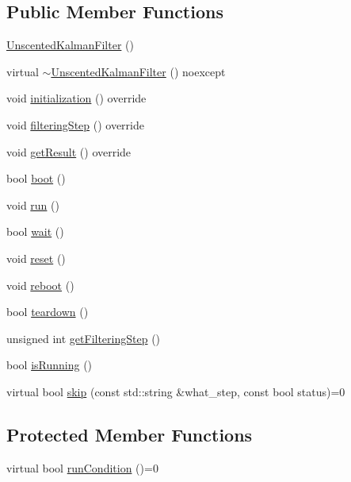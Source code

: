 \subsection*{Public Member Functions}
\begin{DoxyCompactItemize}
\item 
\mbox{\hyperlink{classbfl_1_1UnscentedKalmanFilter_a18a80ca47ed5440b116e1abd8be406b6}{Unscented\+Kalman\+Filter}} ()
\item 
virtual \mbox{\hyperlink{classbfl_1_1UnscentedKalmanFilter_ac3b1c8406622c7295da808fe95e4c170}{$\sim$\+Unscented\+Kalman\+Filter}} () noexcept
\item 
void \mbox{\hyperlink{classbfl_1_1UnscentedKalmanFilter_acd5cfc6344d9ce24fb980aa22ecf4895}{initialization}} () override
\item 
void \mbox{\hyperlink{classbfl_1_1UnscentedKalmanFilter_a169451bb711a03ad2dc28a40e3ad867f}{filtering\+Step}} () override
\item 
void \mbox{\hyperlink{classbfl_1_1UnscentedKalmanFilter_ad25c4f9143bbe834b3adfc81c78b6743}{get\+Result}} () override
\item 
bool \mbox{\hyperlink{classbfl_1_1FilteringAlgorithm_a96651f8464190c0a56d79219a1017147}{boot}} ()
\item 
void \mbox{\hyperlink{classbfl_1_1FilteringAlgorithm_a009cbe5f4bbb16967f6c6ddcaed8fbb1}{run}} ()
\item 
bool \mbox{\hyperlink{classbfl_1_1FilteringAlgorithm_a40372c24fa050eb0274371172df0a244}{wait}} ()
\item 
void \mbox{\hyperlink{classbfl_1_1FilteringAlgorithm_a2403c62fbd7bd7f5cda56a84f5f30331}{reset}} ()
\item 
void \mbox{\hyperlink{classbfl_1_1FilteringAlgorithm_a6022859aa985474fb997343cc935b11e}{reboot}} ()
\item 
bool \mbox{\hyperlink{classbfl_1_1FilteringAlgorithm_a1dc912d89ee8f96d4f3e8209865c5308}{teardown}} ()
\item 
unsigned int \mbox{\hyperlink{classbfl_1_1FilteringAlgorithm_a8c43b1f3dac30934c0a03de348d4a29d}{get\+Filtering\+Step}} ()
\item 
bool \mbox{\hyperlink{classbfl_1_1FilteringAlgorithm_a5cfecab2c778620e2557237472bb1721}{is\+Running}} ()
\item 
virtual bool \mbox{\hyperlink{classbfl_1_1FilteringAlgorithm_ac8a718a614905d89d6a43bbbc70d68b2}{skip}} (const std\+::string \&what\+\_\+step, const bool status)=0
\end{DoxyCompactItemize}
\subsection*{Protected Member Functions}
\begin{DoxyCompactItemize}
\item 
virtual bool \mbox{\hyperlink{classbfl_1_1FilteringAlgorithm_a5fc12882356f6906b102fbfff2bc4b7c}{run\+Condition}} ()=0
\end{DoxyCompactItemize}


